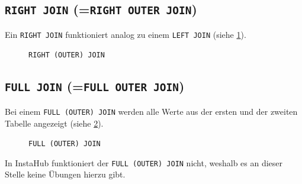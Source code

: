 \subsection{\texorpdfstring{\lstinline|RIGHT JOIN| (=\lstinline|RIGHT OUTER JOIN|)}{RIGHT JOIN (=RIGHT OUTER JOIN)}}
Ein \lstinline|RIGHT JOIN| funktioniert analog zu einem \lstinline|LEFT JOIN| (siehe \cref{fig:venn-right-join}).

\begin{figure}[H]
  \centering
  \caption{\lstinline|RIGHT (OUTER) JOIN|}
  \label{fig:venn-right-join}
\end{figure}


\subsection{\texorpdfstring{\lstinline|FULL JOIN| (=\lstinline|FULL OUTER JOIN|)}{FULL JOIN (=FULL OUTER JOIN)}}
Bei einem \lstinline|FULL (OUTER) JOIN| werden alle Werte aus der ersten und der zweiten Tabelle angezeigt (siehe \cref{fig:venn-outer-join}).

\begin{figure}[H]
  \centering
  \caption{\lstinline|FULL (OUTER) JOIN|}
  \label{fig:venn-outer-join}
\end{figure}
In InstaHub funktioniert der \lstinline|FULL (OUTER) JOIN| nicht, weshalb es an dieser Stelle keine Übungen hierzu gibt.
